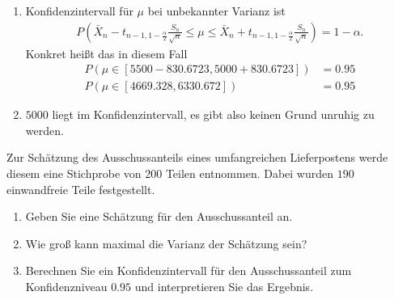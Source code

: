 \solution
\begin{enumerate}
    \item Konfidenzintervall für $\mu$ bei unbekannter Varianz ist 
        \begin{align*}
            P\left( \bar X_n - t_{n-1, 1-\frac{\alpha}{2}} \frac{S_{n}}{\sqrt{n}} 
            \leq \mu \leq \bar X_{n} + t_{n-1, 1-\frac{\alpha}{2}} \frac{S_{n}}{\sqrt{n}}
            \right) = 1-\alpha. 
        \end{align*}
        Konkret heißt das in diesem Fall
        \begin{align*}
            P\left( \mu \in\left[ 5500-830.6723,5000+830.6723 \right]\right) &= 0.95 \\
            P\left( \mu \in\left[ 4669.328, 6330.672 \right]\right) &= 0.95
        \end{align*}

    \item $5000$ liegt im Konfidenzintervall, es gibt also keinen Grund unruhig
        zu werden.
\end{enumerate}

 Zur Schätzung des Ausschussanteils eines
umfangreichen Lieferpostens werde diesem eine Stichprobe von $200$ Teilen entnommen. 
Dabei wurden $190$ einwandfreie Teile festgestellt.
\begin{enumerate}
    \item Geben Sie eine Schätzung für den Ausschussanteil an.
    \item Wie groß kann maximal die Varianz der Schätzung sein? 

    \item Berechnen Sie ein Konfidenzintervall für den Ausschussanteil zum
        Konfidenzniveau $0.95$ und interpretieren Sie das Ergebnis.
\end{enumerate}


